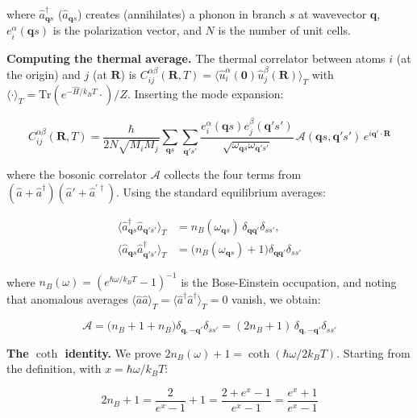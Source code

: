 \documentclass[aps,prb,reprint,amsmath,amssymb,floatfix]{revtex4-2}
\begin{document}
where \(\hat{a}_{\mathbf{q}s}^\dagger\) (\(\hat{a}_{\mathbf{q}s}\))
creates (annihilates) a phonon in branch \(s\) at wavevector
\(\mathbf{q}\), \(e_i^\alpha(\mathbf{q}s)\) is the polarization vector,
and \(N\) is the number of unit cells.

\textbf{Computing the thermal average.} The thermal correlator between
atoms \(i\) (at the origin) and \(j\) (at \(\mathbf{R}\)) is
\(C_{ij}^{\alpha\beta}(\mathbf{R},T) = \langle\hat{u}_i^\alpha(\mathbf{0})\hat{u}_j^\beta(\mathbf{R})\rangle_T\)
with \(\langle\cdot\rangle_T = \mathrm{Tr}(e^{-\hat{H}/k_BT}\cdot)/Z\).
Inserting the mode expansion:

{\footnotesize
\begin{equation*}
C_{ij}^{\alpha\beta}(\mathbf{R},T) = \frac{\hbar}{2N\sqrt{M_iM_j}}\sum_{\mathbf{q}s}\sum_{\mathbf{q}'s'} \frac{e_i^\alpha(\mathbf{q}s)e_j^{\beta}(\mathbf{q}'s')}{\sqrt{\omega_{\mathbf{q}s}\omega_{\mathbf{q}'s'}}} \,\mathcal{A}(\mathbf{q}s,\mathbf{q}'s')\,e^{i\mathbf{q}'\cdot\mathbf{R}}
\end{equation*}
}

where the bosonic correlator \(\mathcal{A}\) collects the four terms
from \((\hat{a}+\hat{a}^\dagger)(\hat{a}'+\hat{a}^{\prime\dagger})\).
Using the standard equilibrium averages:

\begin{align*}
\langle\hat{a}_{\mathbf{q}s}^\dagger\hat{a}_{\mathbf{q}'s'}\rangle_T
  &= n_B(\omega_{\mathbf{q}s})\,\delta_{\mathbf{q}\mathbf{q}'}\delta_{ss'}, \\
\langle\hat{a}_{\mathbf{q}s}\hat{a}_{\mathbf{q}'s'}^\dagger\rangle_T
  &= \bigl(n_B(\omega_{\mathbf{q}s})+1\bigr)\delta_{\mathbf{q}\mathbf{q}'}\delta_{ss'}
\end{align*}

where \(n_B(\omega) = (e^{\hbar\omega/k_BT}-1)^{-1}\) is the
Bose-Einstein occupation, and noting that anomalous averages
\(\langle\hat{a}\hat{a}\rangle_T = \langle\hat{a}^\dagger\hat{a}^\dagger\rangle_T = 0\)
vanish, we obtain:

\begin{equation*}
\mathcal{A} = \bigl(n_B+1+n_B\bigr)\delta_{\mathbf{q},-\mathbf{q}'}\delta_{ss'} = (2n_B+1)\,\delta_{\mathbf{q},-\mathbf{q}'}\delta_{ss'}
\end{equation*}

\textbf{The \(\coth\) identity.} We prove
\(2n_B(\omega)+1 = \coth(\hbar\omega/2k_BT)\). Starting from the
definition, with \(x = \hbar\omega/k_BT\):

\begin{equation*}
2n_B+1 = \frac{2}{e^x-1}+1 = \frac{2+e^x-1}{e^x-1} = \frac{e^x+1}{e^x-1}
\end{equation*}
\end{document}
